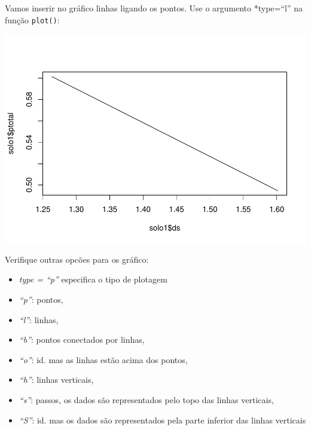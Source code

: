 \documentclass[
]{book}
\newenvironment{Shaded}{\begin{snugshade}}{\end{snugshade}}
\newcommand{\DataTypeTok}[1]{\textcolor[rgb]{0.13,0.29,0.53}{#1}}
\newcommand{\KeywordTok}[1]{\textcolor[rgb]{0.13,0.29,0.53}{\textbf{#1}}}
\newcommand{\NormalTok}[1]{#1}
\newcommand{\OperatorTok}[1]{\textcolor[rgb]{0.81,0.36,0.00}{\textbf{#1}}}
\newcommand{\StringTok}[1]{\textcolor[rgb]{0.31,0.60,0.02}{#1}}
\providecommand{\tightlist}{%
  \setlength{\itemsep}{0pt}\setlength{\parskip}{0pt}}
\begin{document}
Vamos inserir no gráfico linhas ligando os pontos. Use o argumento *type=``l'' na função \texttt{plot()}:

\begin{Shaded}
\end{Shaded}

\includegraphics{TudodoR_files/figure-latex/unnamed-chunk-153-1.pdf}

Verifique outras opcões para os gráfico:

\begin{itemize}
\tightlist
\item
  \emph{type = ``p''} especifica o tipo de plotagem
\item
  \emph{``p''}: pontos,
\item
  \emph{``l''}: linhas,
\item
  \emph{``b''}: pontos conectados por linhas,
\item
  \emph{``o''}: id. mas as linhas estão acima dos pontos,
\item
  \emph{``h''}: linhas verticais,
\item
  \emph{``s''}: passos, os dados são representados pelo topo das linhas verticais,
\item
  \emph{``S''}: id. mas os dados são representados pela parte inferior das linhas verticais
\end{itemize}
\end{document}
